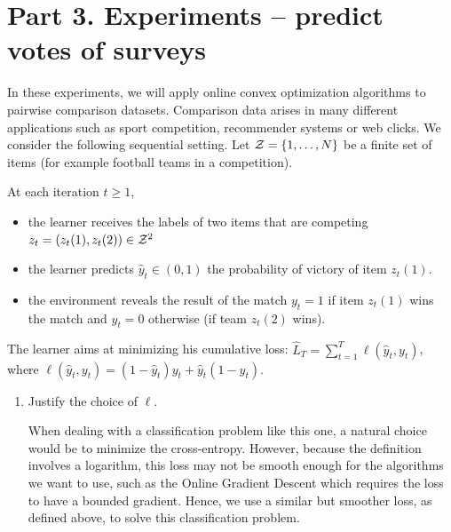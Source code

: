 \section*{Part 3. Experiments -- predict votes of surveys}

In these experiments, we will apply online convex optimization algorithms to pairwise comparison datasets. Comparison data arises in many different applications such as sport competition, recommender systems or web clicks. We consider the following sequential setting. Let $\mathcal{Z} = \{1,\dots,N\}$ be a finite set of items (for example football teams in a competition).

\medskip
At each iteration $t\geq 1$, 
\begin{itemize}[topsep=-2pt]
	\item the learner receives the labels of two items that are competing $z_t = (z_t(1),z_t(2)) \in \mathcal{Z}^2$
	\item the learner predicts $\hat y_t \in (0,1)$ the probability of victory of item $z_t(1)$. 
	\item the environment reveals the result of the match $y_t = 1$ if item $z_t(1)$ wins the match and $y_t = 0$ otherwise (if team $z_t(2)$ wins).
\end{itemize}
The learner aims at minimizing his cumulative loss: $\hat L_T = \sum_{t=1}^T \ell(\hat y_t,y_t)$, where 
$
	\ell(\hat y_t,y_t) = (1-\hat y_t) y_t + \hat y_t (1-y_t) 
$.

\begin{enumerate}[resume]
	\item Justify the choice of $\ell$.

\begin{solution}
When dealing with a classification problem like this one, a natural choice would be to minimize the cross-entropy. However, because the definition involves a logarithm, this loss may not be smooth enough for the algorithms we want to use, such as the Online Gradient Descent which requires the loss to have a bounded gradient. Hence, we use a similar but smoother loss, as defined above, to solve this classification problem.
\end{solution}
\end{enumerate}


